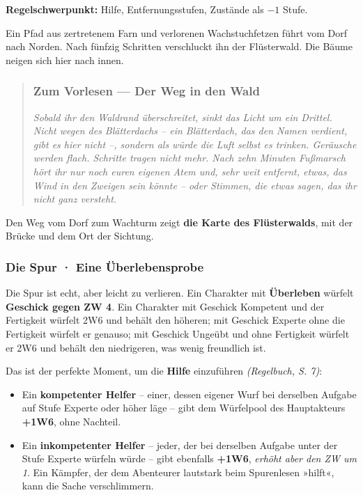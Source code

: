 \documentclass[10pt,a4paper]{article}
\newcommand{\tightlist}{\setlength{\itemsep}{0pt}\setlength{\parskip}{0pt}}
\begin{document}
\textbf{Regelschwerpunkt:} Hilfe, Entfernungsstufen, Zustände als $-1$ Stufe.

Ein Pfad aus zertretenem Farn und verlorenen Wachstuchfetzen führt vom Dorf nach Norden. Nach fünfzig Schritten verschluckt ihn der Flüsterwald. Die Bäume neigen sich hier nach innen.

\begin{quote}
\subsubsection{Zum Vorlesen --- Der Weg in den Wald}\label{zum-vorlesen-im-wald}

\emph{Sobald ihr den Waldrand überschreitet, sinkt das Licht um ein Drittel. Nicht wegen des Blätterdachs -- ein Blätterdach, das den Namen verdient, gibt es hier nicht --, sondern als würde die Luft selbst es trinken. Geräusche werden flach. Schritte tragen nicht mehr. Nach zehn Minuten Fußmarsch hört ihr nur noch euren eigenen Atem und, sehr weit entfernt, etwas, das Wind in den Zweigen sein könnte -- oder Stimmen, die etwas sagen, das ihr nicht ganz versteht.}
\end{quote}

Den Weg vom Dorf zum Wachturm zeigt \textbf{die Karte des Flüsterwalds}, mit der Brücke und dem Ort der Sichtung.

\subsubsection{Die Spur · Eine Überlebensprobe}\label{die-spur-eine-uxfcberlebensprobe}

Die Spur ist echt, aber leicht zu verlieren. Ein Charakter mit \textbf{Überleben} würfelt \textbf{Geschick gegen ZW 4}. Ein Charakter mit Geschick Kompetent und der Fertigkeit würfelt 2W6 und behält den höheren; mit Geschick Experte ohne die Fertigkeit würfelt er genauso; mit Geschick Ungeübt und ohne Fertigkeit würfelt er 2W6 und behält den niedrigeren, was wenig freundlich ist.

Das ist der perfekte Moment, um die \textbf{Hilfe} einzuführen \emph{(Regelbuch, S. 7)}:

\begin{itemize}
\tightlist
\item
  Ein \textbf{kompetenter Helfer} -- einer, dessen eigener Wurf bei derselben Aufgabe auf Stufe Experte oder höher läge -- gibt dem Würfelpool des Hauptakteurs \textbf{+1W6}, ohne Nachteil.
\item
  Ein \textbf{inkompetenter Helfer} -- jeder, der bei derselben Aufgabe unter der Stufe Experte würfeln würde -- gibt ebenfalls \textbf{+1W6}, \emph{erhöht aber den ZW um 1}. Ein Kämpfer, der dem Abenteurer lautstark beim Spurenlesen »hilft«, kann die Sache verschlimmern.
\end{itemize}
\end{document}
